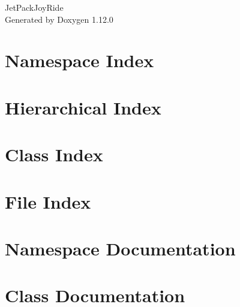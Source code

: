 \documentclass[twoside]{book}
\newcommand{\+}{\discretionary{\mbox{\scriptsize$\hookleftarrow$}}{}{}}
\newcommand{\clearemptydoublepage}{%
    \newpage{\pagestyle{empty}\cleardoublepage}%
  }
\begin{document}
  \raggedbottom
    \hypersetup{pageanchor=false,
                bookmarksnumbered=true,
                pdfencoding=unicode
               }
  \begin{titlepage}
  \vspace*{7cm}
  \begin{center}%
  {\Large Jet\+Pack\+Joy\+Ride}\\
  \vspace*{1cm}
  {\large Generated by Doxygen 1.12.0}\\
  \end{center}
  \end{titlepage}
  \clearemptydoublepage
  \tableofcontents
  \clearemptydoublepage
  \hypersetup{pageanchor=true}

\chapter{Namespace Index}

\chapter{Hierarchical Index}

\chapter{Class Index}

\chapter{File Index}

\chapter{Namespace Documentation}

\chapter{Class Documentation}

































\end{document}
